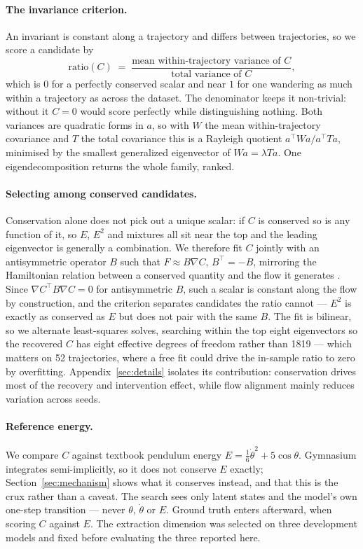 \paragraph{The invariance criterion.} An invariant is constant along a trajectory and differs between
trajectories, so we score a candidate by
\begin{equation}
\text{ratio}(C) \;=\;
\frac{\text{mean within-trajectory variance of } C}{\text{total variance of } C},
\label{eq:ratio}
\end{equation}
which is $0$ for a perfectly conserved scalar and near $1$ for one wandering as much within a
trajectory as across the dataset. The denominator keeps it non-trivial: without it $C=0$ would score
perfectly while distinguishing nothing. Both variances are quadratic forms in $a$, so with $W$ the
mean within-trajectory covariance and $T$ the total covariance this is a Rayleigh quotient
$a^\top W a / a^\top T a$, minimised by the smallest generalized eigenvector of $W a = \lambda T a$.
One eigendecomposition returns the whole family, ranked.

\paragraph{Selecting among conserved candidates.} Conservation alone does not pick out a unique
scalar: if $C$ is conserved so is any function of it, so $E$, $E^2$ and mixtures all sit near the top
and the leading eigenvector is generally a combination. We therefore fit $C$ jointly with an
antisymmetric operator $B$ such that $F \approx B\nabla C$, $B^\top = -B$, mirroring the Hamiltonian
relation between a conserved quantity and the flow it generates \citep{arnold1989mathematical}. Since
$\nabla C^\top B\nabla C = 0$ for antisymmetric $B$, such a scalar is constant along the flow by
construction, and the criterion separates candidates the ratio cannot --- $E^2$ is exactly as
conserved as $E$ but does not pair with the same $B$. The fit is bilinear, so we alternate
least-squares solves, searching within the top eight eigenvectors so the recovered $C$ has eight
effective degrees of freedom rather than 1819 --- which matters on 52 trajectories, where a free fit
could drive the in-sample ratio to zero by overfitting. Appendix~\ref{sec:details} isolates its
contribution: conservation drives most of the recovery and intervention effect, while flow alignment
mainly reduces variation across seeds.

\paragraph{Reference energy.} We compare $C$ against textbook pendulum energy
$E = \tfrac{1}{6}\dot\theta^2 + 5\cos\theta$. Gymnasium integrates semi-implicitly, so it does not
conserve $E$ exactly; Section~\ref{sec:mechanism} shows what it conserves instead, and that this is
the crux rather than a caveat. The search sees only latent states and the model's own one-step
transition --- never $\theta$, $\dot\theta$ or $E$. Ground truth enters afterward, when scoring $C$
against $E$. The extraction dimension was selected on three development models and fixed before
evaluating the three reported here.
